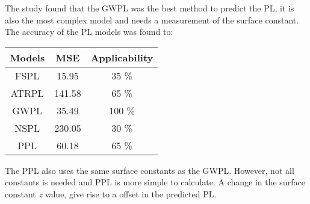 \large



The study found that the GWPL was the best method to predict the PL, it is also the most complex model and needs a measurement of the surface constant. The accuracy of the PL models was found to:

\begin{center}
\begin{tabular}{|c|c|c|}
\hline
\rowcolor{white}
\textbf{Models} & \textbf{MSE} & \textbf{Applicability} \\ \hline \rowcolor{white}
FSPL            & 15.95        & 35 \%                  \\ \hline \rowcolor{white}
ATRPL 		    & 141.58       & 65 \%                  \\ \hline \rowcolor{white} %
GWPL            & 35.49        & 100 \%                 \\ \hline \rowcolor{white}
NSPL            & 230.05       & 30 \%                  \\ \hline \rowcolor{white}
PPL            & 60.18        & 65 \%                  \\ \hline
\end{tabular}
\end{center}


The PPL also uses the same surface constants as the GWPL. However, not all constants is needed and PPL is more simple to calculate. A change in the surface constant \textit{z} value, give rise to a offset in the predicted PL.

